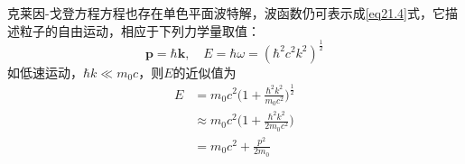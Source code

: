 克莱因-戈登方程方程也存在单色平面波特解，波函数仍可表示成\eqref{eq21.4}式，它描述粒子的自由运动，相应于下列力学量取值：
\begin{equation}\label{eq21.25}
	\boldsymbol{p}=\hbar\boldsymbol{k},\quad E=\hbar\omega=(\hbar^{2}c^{2}k^{2})^{\frac{1}{2}}
\end{equation}
如低速运动，$\hbar k \ll m_{0}c$，则$E$的近似值为
\begin{equation}\label{eq21.26}
	\begin{aligned}
		E &=m_{0}c^{2} \bigg(1+\frac{\hbar^{2}k^{2}}{m_{0}c^{2}} \bigg)^{\frac{1}{2}}	\\
		  &\approx m_{0}c^{2} \bigg(1+\frac{\hbar^{2}k^{2}}{2m_{0}c^{2}} \bigg) \\
		  &=m_{0}c^{2}+\frac{p^{2}}{2m_{0}}
	\end{aligned}
\end{equation}